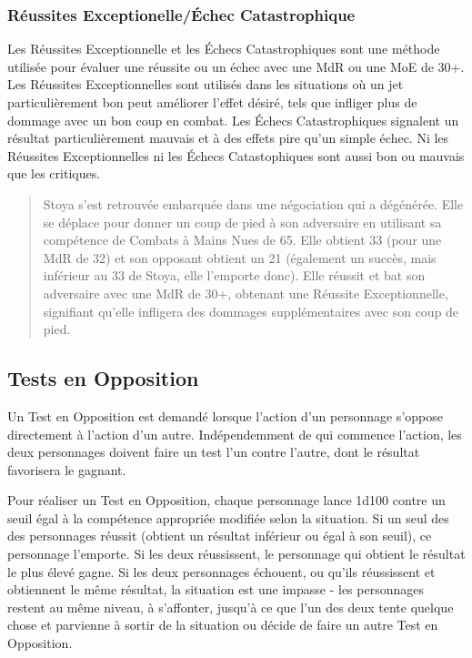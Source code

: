 \subsubsection{Réussites Exceptionelle/Échec Catastrophique} \label{sec:excell-succ-fail} 

Les Réussites Exceptionnelle et les Échecs Catastrophiques sont une méthode utilisée pour évaluer une réussite ou un échec avec une MdR ou une MoE de 30+. Les Réussites Exceptionnelles sont utilisés dans les situations où un jet particulièrement bon peut améliorer l'effet désiré, tels que infliger plus de dommage avec un bon coup en combat. Les Échecs Catastrophiques signalent un résultat particulièrement mauvais et à des effets pire qu'un simple échec. Ni les Réussites Exceptionnelles ni les Échecs Catastophiques sont aussi bon ou mauvais que les critiques. 

\begin{quotation} Stoya s'est retrouvée embarquée dans une négociation qui a dégénérée. Elle se déplace pour donner un coup de pied à son adversaire en utilisant sa compétence de Combats à Mains Nues de 65. Elle obtient 33 (pour une MdR de 32) et son opposant obtient un 21 (également un succès, mais inférieur au 33 de Stoya, elle l'emporte donc). Elle réussit et bat son adversaire avec une MdR de 30+, obtenant une Réussite Exceptionnelle, signifiant qu'elle infligera des dommages supplémentaires avec son coup de pied. \end{quotation} 

\subsection{Tests en Opposition} \label{sec:opposed-tests} 

Un Test en Opposition est demandé lorsque l'action d'un personnage s'oppose directement à l'action d'un autre. Indépendemment de qui commence l'action, les deux personnages doivent faire un test l'un contre l'autre, dont le résultat favorisera le gagnant. 

Pour réaliser un Test en Opposition, chaque personnage lance 1d100 contre un seuil égal à la compétence appropriée modifiée selon la situation. Si un seul des des personnages réussit (obtient un résultat inférieur ou égal à son seuil), ce personnage l'emporte. Si les deux réussissent, le personnage qui obtient le résultat le plus élevé gagne. Si les deux personnages échouent, ou qu'ils réussissent et obtiennent le même résultat, la situation est une impasse - les personnages restent au même niveau, à s'affonter, jusqu'à ce que l'un des deux tente quelque chose et parvienne à sortir de la situation ou décide de faire un autre Test en Opposition. 

